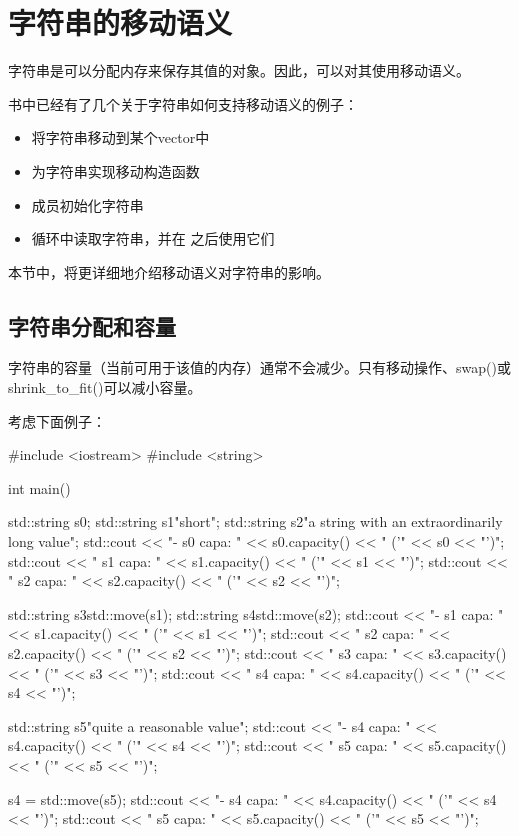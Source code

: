 \section{字符串的移动语义}
字符串是可以分配内存来保存其值的对象。因此，可以对其使用移动语义。

书中已经有了几个关于字符串如何支持移动语义的例子：

\begin{itemize}
	\item 将字符串移动到某个vector中
	\item 为字符串实现移动构造函数
	\item 成员初始化字符串
	\item 循环中读取字符串，并在  之后使用它们
\end{itemize}

本节中，将更详细地介绍移动语义对字符串的影响。

\subsection{字符串分配和容量}

字符串的容量（当前可用于该值的内存）通常不会减少。只有移动操作、swap()或shrink_to_fit()可以减小容量。

考虑下面例子：

\begin{cppcode}
#include <iostream>
#include <string>

int main()
{
	std::string s0;
	std::string s1{"short"};
	std::string s2{"a string with an extraordinarily long value"};
	std::cout << "- s0 capa: " << s0.capacity() << " ('" << s0 << "')\n";
	std::cout << " s1 capa: " << s1.capacity() << " ('" << s1 << "')\n";
	std::cout << " s2 capa: " << s2.capacity() << " ('" << s2 << "')\n";

	std::string s3{std::move(s1)};
	std::string s4{std::move(s2)};
	std::cout << "- s1 capa: " << s1.capacity() << " ('" << s1 << "')\n";
	std::cout << " s2 capa: " << s2.capacity() << " ('" << s2 << "')\n";
	std::cout << " s3 capa: " << s3.capacity() << " ('" << s3 << "')\n";
	std::cout << " s4 capa: " << s4.capacity() << " ('" << s4 << "')\n";

	std::string s5{"quite a reasonable value"};
	std::cout << "- s4 capa: " << s4.capacity() << " ('" << s4 << "')\n";
	std::cout << " s5 capa: " << s5.capacity() << " ('" << s5 << "')\n";

	s4 = std::move(s5);
	std::cout << "- s4 capa: " << s4.capacity() << " ('" << s4 << "')\n";
	std::cout << " s5 capa: " << s5.capacity() << " ('" << s5 << "')\n";
}
\end{cppcode}

